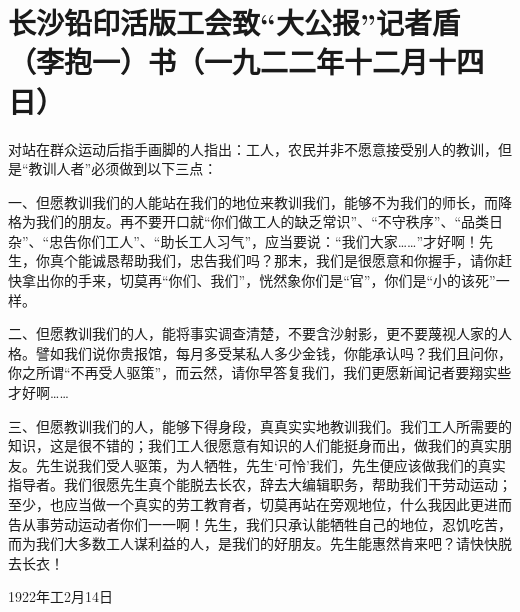 \section{长沙铅印活版工会致“大公报”记者盾（李抱一）书（一九二二年十二月十四日）}


对站在群众运动后指手画脚的人指出：工人，农民并非不愿意接受别人的教训，但是“教训人者”必须做到以下三点：

一、但愿教训我们的人能站在我们的地位来教训我们，能够不为我们的师长，而降格为我们的朋友。再不要开口就“你们做工人的缺乏常识”、“不守秩序”、“品类日杂”、“忠告你们工人”、“助长工人习气”，应当要说：“我们大家……”才好啊！先生，你真个能诚恳帮助我们，忠告我们吗？那末，我们是很愿意和你握手，请你赶快拿出你的手来，切莫再“你们、我们”，恍然象你们是“官”，你们是“小的该死”一样。

二、但愿教训我们的人，能将事实调查清楚，不要含沙射影，更不要蔑视人家的人格。譬如我们说你贵报馆，每月多受某私人多少金钱，你能承认吗？我们且问你，你之所谓“不再受人驱策”，而云然，请你早答复我们，我们更愿新闻记者要翔实些才好啊……

三、但愿教训我们的人，能够下得身段，真真实实地教训我们。我们工人所需要的知识，这是很不错的；我们工人很愿意有知识的人们能挺身而出，做我们的真实朋友。先生说我们受人驱策，为人牺牲，先生‘可怜’我们，先生便应该做我们的真实指导者。我们很愿先生真个能脱去长农，辞去大编辑职务，帮助我们干劳动运动；至少，也应当做一个真实的劳工教育者，切莫再站在旁观地位，什么我因此更进而告从事劳动运动者你们一一啊！先生，我们只承认能牺牲自己的地位，忍饥吃苦，而为我们大多数工人谋利益的人，是我们的好朋友。先生能惠然肯来吧？请快快脱去长衣！

\begin{flushright}1922年工2月14日\end{flushright}

